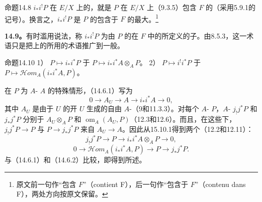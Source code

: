 \begin{SGAresult}{命题}{14.8}
$i_*i^!P$ 在 $E/X$ 上的，就是 $P$ 在 $E/X$ 上（9.3.5）包含 $F$ 的（采用5.9.1的记号）。换言之，$i_*i^!P$ 是 $P$ 的包含于 $F$ 的最大。\footnote{原文前一句作“包含 $F$”（contient F），后一句作“包含于 $F$”（contenu dans F），两处方向按原文保留。}
\end{SGAresult}
\textbf{14.9。}有时滥用说法，称 $i_*i^!P$ 为由 $P$ 的在 $F$ 中的所定义的子。由8.5.3，这一术语只是把上的所用的术语推广到一般。
\begin{SGAresult}{命题}{14.10}
1） $P\mapsto i_*i^*P$ 于 $P\mapsto i_*i^*A\otimes_A P$。
2） $P\mapsto i^!i^*P$ 于 $P\mapsto\mathscr{H}\!om_A(i_*i^*A,P)$。
\end{SGAresult}
在 $P$ 为 $A$- $A$ 的特殊情形，（14.6.1）写为
\[0\longrightarrow A_U\longrightarrow A\longrightarrow i_*i^*A\longrightarrow0,\tag{14.10.1}\]
其中 $A_U$ 是由于 $U$ 的开 $U$ 生成的自由 $A$-（9和11.3.3）。对每个 $A$- $P$，$A$- $j_!j^*P$ 和 $j_*j^*P$ 分别于 $A_U\otimes_A P$ 和 $\operatorname{om}_A(A_U,P)$（12.3和12.6）。而且，在这些下， $j_!j^*P\to P$ 与 $P\to j_*j^*P$ 来自 $A_U\to A$。因此从15.10.1得到两个（12.2和12.11）：
\[j_!j^*P\longrightarrow P\longrightarrow i_*i^*A\otimes_A P\longrightarrow0,\]
\[0\longrightarrow\mathscr{H}\!om_A(i_*i^*A,P)\longrightarrow P\longrightarrow j_*j^*P.\]
与（14.6.1）和（14.6.2）比较，即得到所述。

